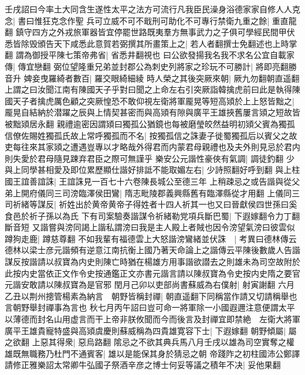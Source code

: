 壬戌詔曰今率土大同含生遂性太平之法方可流行凡我臣民澡身浴德家家自修人人克念|{
	書曰惟狂克念作聖}
兵可立威不可不戢刑可助化不可專行禁衛九重之餘|{
	重直龍翻}
鎮守四方之外戎旅軍器皆宜停罷世路既夷羣方無事武力之子俱可學經民間甲伏悉皆除毁頒告天下咸悉此意賀若弼撰其所畫策上之|{
	若人者翻撰士免翻述也上時掌翻}
謂為御授平陳七策帝弗省|{
	省悉井翻視也}
曰公欲發揚我名我不求名公宜自載家傳|{
	傳宜戀翻}
弼位望隆重兄弟並封郡公為刺史列將家之珍玩不可勝計|{
	將即亮翻勝音升}
婢妾曳羅綺者數百|{
	羅交眼綺細綾}
時人榮之其後突厥來朝|{
	厥九勿翻朝直遥翻}
上謂之曰汝聞江南有陳國天子乎對曰聞之上命左右引突厥詣韓擒虎前曰此是執得陳國天子者擒虎厲色顧之突厥惶恐不敢仰視左衛將軍龎晃等短高熲於上上怒皆黜之|{
	龎晃自結納於潜躍之辰與上情契甚密而與高熲有隙與廣平王雄挾舊屢言熲之短故皆被黜熲居永翻}
親禮逾密因謂熲曰獨孤公猶鏡也每被磨瑩皎然益明初熲父賓為獨孤信僚佐賜姓獨孤氏故上常呼獨孤而不名|{
	按獨孤信之誅妻子徙蜀獨孤后以賓父之故吏每往來其家熲之遭遇豈專以才略哉外得君而内蒙君母親禮也及夫外則見忌於君内則失愛於君母隨見踈弃君臣之際可無謹乎}
樂安公元諧性豪俠有氣調|{
	調徒釣翻}
少與上同學甚相愛及即位累歷顯仕諧好排詆不能取媚左右|{
	少詩照翻好呼到翻}
與上柱國王誼善誼誅|{
	王誼誅見一百七十六卷陳長城公至德三年}
上稍疎忌之或告諧與從父弟上開府儀同三司滂臨澤侯田鸞|{
	隋志毗陵郡義興縣舊有臨澤縣從才用翻}
上儀同三司祈緒等謀反|{
	祈姓出於黄帝黄帝子得姓者十四人祈其一也又曰晉獻侯四世孫曰奚食邑於祈子孫以為氏}
下有司案驗奏諧謀令祈緒勒党項兵斷巴蜀|{
	下遐嫁翻令力丁翻斷音短}
又諧嘗與滂同謁上諧私謂滂曰我是主人殿上者賊也因令滂望氣滂曰彼雲似蹲狗走鹿|{
	蹲慈尊翻}
不如我輩有福德雲上大怒諧滂鸞緒並伏誅　|{
	考異曰德林傳云德林以梁士彦元諧頻有逆意江南抗衡上國乃著天命論上之諧傳云平陳後數歲人告諧謀反按諧請以叔寶為内史則陳亡時猶在楊雄方用事諧欲譛去之則雄未為司空故附於此按内史當依正文作令史按通鑑正文亦書元諧言請以陳叔寶為令史按内史隋之要官元諧安敢請以陳叔寶為是官邪}
閏月己卯以吏部尚書蘇威為右僕射|{
	射寅謝翻}
六月乙丑以荆州摠管楊素為納言　朝野皆稱封禪|{
	朝直遥翻下同稱當作請又切請稱舉也言朝野舉封禪事為言也}
秋七月丙午詔曰豈可命一將軍除一小國遐邇注意便謂太平以薄德而封名山用虚言而干上帝非朕攸聞而今而後言及封禪宜即禁絶　左衛大將軍廣平王雄貴寵特盛與高熲虞慶則蘇威稱為四貴雄寛容下士|{
	下遐嫁翻}
朝野傾屬|{
	屬之欲翻}
上惡其得衆|{
	惡烏路翻}
隂忌之不欲其典兵馬八月壬戌以雄為司空實奪之權雄既無職務乃杜門不通賓客|{
	雄以是能保其身於猜忌之朝}
帝踐阼之初柱國沛公鄭譯請修正雅樂詔太常卿牛弘國子祭酒辛彦之博士何妥等議之積年不决|{
	妥他果翻}
